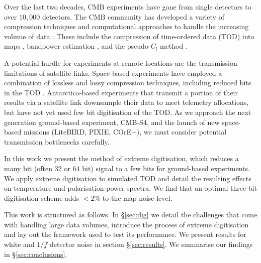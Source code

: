 \documentclass[apj]{emulateapj}
\begin{document}

Over the last two decades, CMB experiments have gone from single detectors to over $10,000$ detectors. The CMB community has developed a variety of compression techniques and computational approaches to handle the increasing volume of data \citep{tristam2007}. These include the compression of time-ordered data (TOD) into maps \citep{tegmark1997}, bandpower estimation \citep{tegmark1998}, and the pseudo-$C_l$ method \citep{brown2005}.

A potential hurdle for experiments at remote locations are the transmission limitations of satellite links. Space-based experiments have employed a combination of lossless and lossy compression techniques, including reduced bits in the TOD \citep{gaztanaga1998, maris2003}. Antarctica-based experiments that transmit a portion of their results via a satellite link downsample their data to meet telemetry allocations, but have not yet used few bit digitisation of the TOD. As we approach the next generation ground-based experiment, CMB-S4, and the launch of new space-based missions (LiteBIRD, PIXIE, COrE+), we must consider potential transmission bottlenecks carefully. %

In this work we present the method of extreme digitisation, which reduces a many bit (often 32 or 64 bit) signal to a few bits for ground-based experiments. We apply extreme digitisation to simulated TOD and detail the resulting effects on temperature and polarisation power spectra. We find that an optimal three bit digitisation scheme adds $<2\%$ to the map noise level.

This work is structured as follows. In \S\ref{sec:dig} we detail the challenges that come with handling large data volumes, introduce the process of extreme digitisation and lay out the framework used to test its performance. We present results for white and $1/f$ detector noise in section \S\ref{sec:results}. We summarise our findings in \S\ref{sec:conclusions}.

\end{document}
